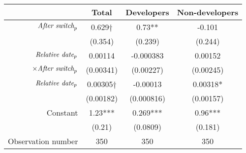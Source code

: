 \begin{tabular}{|r|c|c|c|}
\hline
&  Total & Developers & Non-developers \\
\hline
$\mbox{\emph{After switch}}_p$ & 0.629$\dagger$ & 0.73** & -0.101 \\
 & (0.354) & (0.239) & (0.244) \\
\hline
$\mbox{\emph{Relative date}}_p$ & 0.00114 & -0.000383 & 0.00152 \\
$\times \mbox{\emph{After switch}}_p$ & (0.00341) & (0.00227) & (0.00245) \\
\hline
$\mbox{\emph{Relative date}}_p$ & 0.00305$\dagger$ & -0.00013 & 0.00318* \\
 & (0.00182) & (0.000816) & (0.00157) \\
\hline
Constant & 1.23*** & 0.269*** & 0.96*** \\
 & (0.21) & (0.0809) & (0.181) \\
\hline
Observation number & 350 & 350 & 350 \\
\hline
\end{tabular}